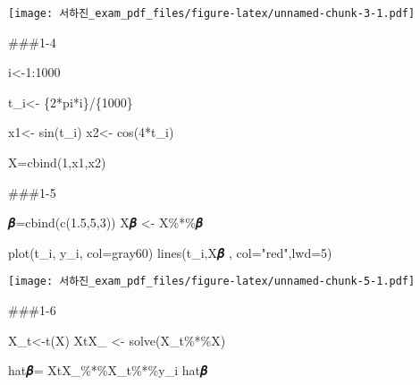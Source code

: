 \documentclass[
]{article}
\newenvironment{Shaded}{\begin{snugshade}}{\end{snugshade}}
\newcommand{\AttributeTok}[1]{\textcolor[rgb]{0.77,0.63,0.00}{#1}}
\newcommand{\DecValTok}[1]{\textcolor[rgb]{0.00,0.00,0.81}{#1}}
\newcommand{\FloatTok}[1]{\textcolor[rgb]{0.00,0.00,0.81}{#1}}
\newcommand{\FunctionTok}[1]{\textcolor[rgb]{0.00,0.00,0.00}{#1}}
\newcommand{\NormalTok}[1]{#1}
\newcommand{\OtherTok}[1]{\textcolor[rgb]{0.56,0.35,0.01}{#1}}
\newcommand{\SpecialCharTok}[1]{\textcolor[rgb]{0.00,0.00,0.00}{#1}}
\newcommand{\StringTok}[1]{\textcolor[rgb]{0.31,0.60,0.02}{#1}}
\begin{document}
\texttt{[image: 서하진\_exam\_pdf\_files/figure-latex/unnamed-chunk-3-1.pdf]}

\#\#\#1-4

\begin{Shaded}
\begin{Highlighting}[]
\NormalTok{i}\OtherTok{\textless{}{-}}\DecValTok{1}\SpecialCharTok{:}\DecValTok{1000}

\NormalTok{t\_i}\OtherTok{\textless{}{-}}\NormalTok{ \{}\DecValTok{2}\SpecialCharTok{*}\NormalTok{pi}\SpecialCharTok{*}\NormalTok{i\}}\SpecialCharTok{/}\NormalTok{\{}\DecValTok{1000}\NormalTok{\}}

\NormalTok{x1}\OtherTok{\textless{}{-}} \FunctionTok{sin}\NormalTok{(t\_i)}
\NormalTok{x2}\OtherTok{\textless{}{-}} \FunctionTok{cos}\NormalTok{(}\DecValTok{4}\SpecialCharTok{*}\NormalTok{t\_i)}

\NormalTok{X}\OtherTok{=}\FunctionTok{cbind}\NormalTok{(}\DecValTok{1}\NormalTok{,x1,x2)}
\end{Highlighting}
\end{Shaded}

\#\#\#1-5

\begin{Shaded}
\begin{Highlighting}[]
\NormalTok{𝜷}\OtherTok{=}\FunctionTok{cbind}\NormalTok{(}\FunctionTok{c}\NormalTok{(}\FloatTok{1.5}\NormalTok{,}\DecValTok{5}\NormalTok{,}\DecValTok{3}\NormalTok{))}
\NormalTok{X𝜷 }\OtherTok{\textless{}{-}}\NormalTok{ X}\SpecialCharTok{\%*\%}\NormalTok{𝜷}

\FunctionTok{plot}\NormalTok{(t\_i, y\_i, }\AttributeTok{col=}\StringTok{\textquotesingle{}gray60\textquotesingle{}}\NormalTok{)}
\FunctionTok{lines}\NormalTok{(t\_i,X𝜷 , }\AttributeTok{col=}\StringTok{"red"}\NormalTok{,}\AttributeTok{lwd=}\StringTok{\textquotesingle{}5\textquotesingle{}}\NormalTok{)}
\end{Highlighting}
\end{Shaded}

\texttt{[image: 서하진\_exam\_pdf\_files/figure-latex/unnamed-chunk-5-1.pdf]}

\#\#\#1-6

\begin{Shaded}
\begin{Highlighting}[]
\NormalTok{X\_t}\OtherTok{\textless{}{-}}\FunctionTok{t}\NormalTok{(X)}
\NormalTok{XtX\_ }\OtherTok{\textless{}{-}} \FunctionTok{solve}\NormalTok{(X\_t}\SpecialCharTok{\%*\%}\NormalTok{X)}

\NormalTok{hat𝜷}\OtherTok{=}\NormalTok{ XtX\_}\SpecialCharTok{\%*\%}\NormalTok{X\_t}\SpecialCharTok{\%*\%}\NormalTok{y\_i}
\NormalTok{hat𝜷}
\end{Highlighting}
\end{Shaded}
\end{document}
